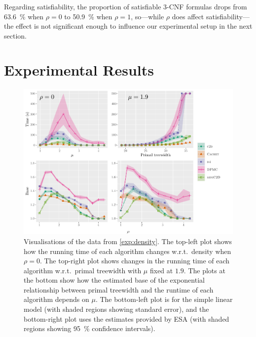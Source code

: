 \documentclass{article}
\theoremstyle{definition}
\begin{document}
Regarding satisfiability, the proportion of satisfiable 3-CNF formulas drops
from \SI{63.6}{\percent} when $\rho = 0$ to \SI{50.9}{\percent} when $\rho = 1$,
so---while $\rho$ does affect satisfiability---the effect is not significant
enough to influence our experimental setup in the next section.


\section{Experimental Results}\label{sec:experiments}

\begin{figure}[t]
  \centering
  \includegraphics{treewidth}
  \caption[Visualisations of the data from \cref{exp:density}. The top-left plot shows how the running time of each algorithm changes w.r.t.\ density when $\rho = 0$. The top-right plot shows changes in the running time of each algorithm w.r.t.\ primal treewidth with $\mu$ fixed at $1.9$. The plots at the bottom show how the estimated base of the exponential relationship between primal treewidth and the runtime of each algorithm depends on $\mu$. The bottom-left plot is for the simple linear model (with shaded regions showing standard error), and the bottom-right plot uses the estimates provided by ESA (with shaded regions showing \SI{95}{\percent} confidence intervals).]%
          {Visualisations of the data from \cref{exp:density}. The top-left plot shows how the running time of each algorithm changes w.r.t.\ density when $\rho = 0$. The top-right plot shows changes in the running time of each algorithm w.r.t.\ primal treewidth with $\mu$ fixed at $1.9$. The plots at the bottom show how the estimated base of the exponential relationship between primal treewidth and the runtime of each algorithm depends on $\mu$. The bottom-left plot is for the simple linear model (with shaded regions showing standard error), and the bottom-right plot uses the estimates provided by ESA  (with shaded regions showing \SI{95}{\percent} confidence intervals).}
  \label{fig:treewidth}
\end{figure}
\end{document}
